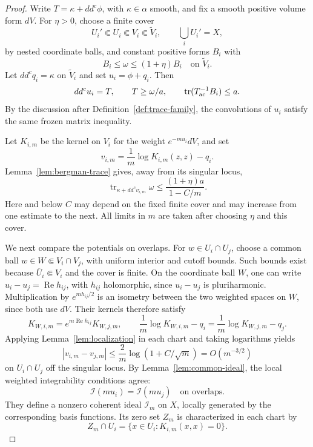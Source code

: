 \documentclass[reqno]{amsart}
\numberwithin{equation}{section}
\theoremstyle{definition}
\DeclareMathOperator{\tr}{tr}
\begin{document}
\begin{proof}
Write $T=\kappa+dd^c\phi$, with $\kappa\in\alpha$ smooth, and
fix a smooth positive volume form $dV$.
For $\eta>0$, choose a finite cover
\[
U_i'\Subset U_i\Subset V_i\Subset\widetilde V_i,\qquad
\bigcup_iU_i'=X,
\]
by nested coordinate balls, and constant positive forms $B_i$ with
\begin{equation}\label{eq:frozen-background}
B_i\le\omega\le(1+\eta)B_i
\quad\text{on }\widetilde V_i.
\end{equation}
Let $dd^cq_i=\kappa$ on $\widetilde V_i$ and set
$u_i=\phi+q_i$. Then
\[
dd^cu_i=T,\qquad T\ge\omega/a,\qquad
\tr(T_{\rm ac}^{-1}B_i)\le a.
\]
By the discussion after Definition~\ref{def:trace-family}, the convolutions
of $u_i$ satisfy the same frozen matrix inequality.

Let $K_{i,m}$ be the kernel on $V_i$ for the weight
$e^{-mu_i}dV$, and set
\[
v_{i,m}=\frac1m\log K_{i,m}(z,z)-q_i.
\]
Lemma~\ref{lem:bergman-trace} gives, away from its singular locus,
\begin{equation}\label{eq:local-trace}
\tr_{\kappa+dd^cv_{i,m}}\omega
\le\frac{(1+\eta)a}{1-C/m}.
\end{equation}
Here and below $C$ may depend on the fixed finite cover and
may increase from one estimate to the next.
All limits in $m$ are taken after choosing $\eta$ and this cover.

We next compare the potentials on overlaps.
For $w\in U_i\cap U_j$, choose a common ball
$w\in W\Subset V_i\cap V_j$, with uniform interior and cutoff
bounds. Such bounds exist because
$\overline U_i\Subset V_i$ and the cover is finite.
On the coordinate ball $W$, one can write $u_i-u_j=\operatorname{Re}h_{ij}$, with
$h_{ij}$ holomorphic, since $u_i-u_j$ is pluriharmonic.
Multiplication by $e^{mh_{ij}/2}$ is an isometry between the two
weighted spaces on $W$, since both use $dV$.
Their kernels therefore satisfy
\[
K_{W,i,m}=e^{m\operatorname{Re}h_{ij}}K_{W,j,m},\qquad
\frac1m\log K_{W,i,m}-q_i
=\frac1m\log K_{W,j,m}-q_j.
\]
Applying Lemma~\ref{lem:localization} in each chart
and taking logarithms yields
\begin{equation}\label{eq:overlap}
|v_{i,m}-v_{j,m}|
\le\frac2m\log(1+C/\sqrt m)=O(m^{-3/2})
\end{equation}
on $U_i\cap U_j$ off the singular locus.
By Lemma~\ref{lem:common-ideal}, the local weighted
integrability conditions agree:
\[
\mathcal I(mu_i)=\mathcal I(mu_j)\quad\text{on overlaps}.
\]
They define a nonzero coherent ideal $\mathcal I_m$ on $X$,
locally generated by the corresponding basis functions. Its zero
set $Z_m$ is characterized in each chart by
\[
Z_m\cap U_i=\{x\in U_i:K_{i,m}(x,x)=0\}.
\]


\end{proof}
\end{document}
